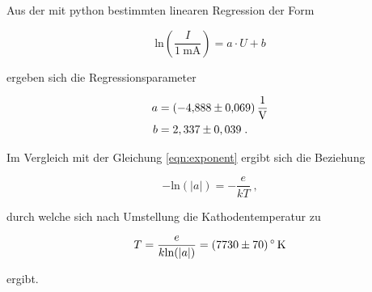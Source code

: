 Aus der mit python bestimmten linearen Regression der Form 

\begin{equation*}
    \text{ln} \left(\frac{I}{\SI{1}{\milli\ampere}} \right) 
    = a \cdot U + b
\end{equation*}

ergeben sich die Regressionsparameter 

\begin{align*}
    a &= \SI{-4.888 +- 0.069}{\per\volt}\\
    b &= 2,337 \pm 0,039 \; .
\end{align*}

Im Vergleich mit der Gleichung \eqref{eqn:exponent} ergibt sich die Beziehung

\begin{equation*}
      - \text{ln}(|a|) = - \frac{e}{kT} \; ,
\end{equation*}

durch welche sich nach Umstellung die Kathodentemperatur zu

\begin{equation}
      T = \frac{e}{k \text{ln}(|a|)} = \SI{7730 +- 70}{\degree\kelvin}
\end{equation}

ergibt.


